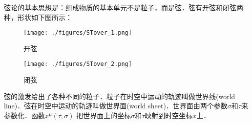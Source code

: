 弦论的基本思想是：组成物质的基本单元不是粒子，而是弦．弦有开弦和闭弦两种，形状如下图所示：
\begin{figure}[ht]
\centering
\texttt{[image: ./figures/STover\_1.png]}
\caption{开弦} \label{STover_fig1}
\end{figure}
\begin{figure}[ht]
\centering
\texttt{[image: ./figures/STover\_2.png]}
\caption{闭弦} \label{STover_fig2}
\end{figure}
弦的激发给出了各种不同的粒子．粒子在时空中运动的轨迹叫做世界线(world line)．弦在时空中运动的轨迹叫做世界面(world sheet)．世界面由两个参数$\sigma$和$\tau$来参数化．函数$x^\mu(\tau,\sigma)$ 把世界面上的坐标$\sigma$和$\tau$映射到时空坐标$x$上．

